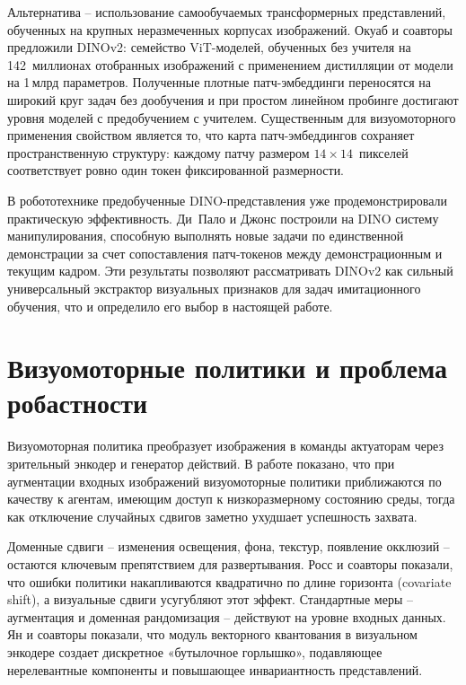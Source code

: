 Альтернатива -- использование самообучаемых трансформерных представлений, обученных на крупных неразмеченных корпусах изображений. Окуаб и соавторы \cite{oquab2024dinov2} предложили DINOv2: семейство ViT-моделей, обученных без учителя на 142~миллионах отобранных изображений с применением дистилляции от модели на 1\,млрд параметров. Полученные плотные патч-эмбеддинги переносятся на широкий круг задач без дообучения и при простом линейном пробинге достигают уровня моделей с предобучением с учителем. Существенным для визуомоторного применения свойством является то, что карта патч-эмбеддингов сохраняет пространственную структуру: каждому патчу размером $14{\times}14$~пикселей соответствует ровно один токен фиксированной размерности.

В робототехнике предобученные DINO-представления уже продемонстрировали практическую эффективность. Ди~Пало и Джонс \cite{dipalo2024dinobot} построили на DINO систему манипулирования, способную выполнять новые задачи по единственной демонстрации за счет сопоставления патч-токенов между демонстрационным и текущим кадром. Эти результаты позволяют рассматривать DINOv2 как сильный универсальный экстрактор визуальных признаков для задач имитационного обучения, что и определило его выбор в настоящей работе.

\section{Визуомоторные политики и проблема робастности}

Визуомоторная политика преобразует изображения в команды актуаторам через зрительный энкодер и генератор действий. В работе \cite{mandlekar2021robomimic} показано, что при аугментации входных изображений визуомоторные политики приближаются по качеству к агентам, имеющим доступ к низкоразмерному состоянию среды, тогда как отключение случайных сдвигов заметно ухудшает успешность захвата.

Доменные сдвиги -- изменения освещения, фона, текстур, появление окклюзий -- остаются ключевым препятствием для развертывания. Росс и соавторы \cite{ross2011reduction} показали, что ошибки политики накапливаются квадратично по длине горизонта (covariate shift), а визуальные сдвиги усугубляют этот эффект. Стандартные меры -- аугментация и доменная рандомизация -- действуют на уровне входных данных. Ян и соавторы \cite{yang2023vector} показали, что модуль векторного квантования в визуальном энкодере создает дискретное «бутылочное горлышко», подавляющее нерелевантные компоненты и повышающее инвариантность представлений.

